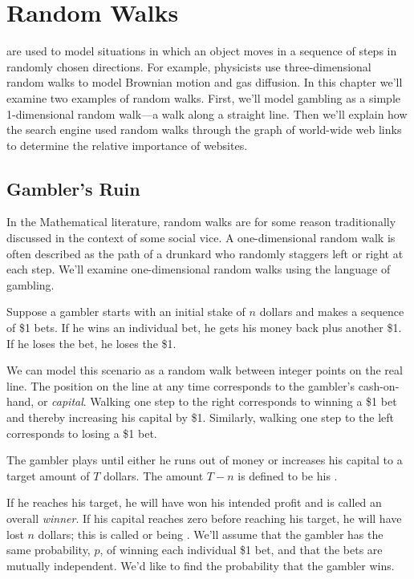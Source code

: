 \newcommand{\PRnk}{\operatorname{Rank}}

\chapter{Random Walks}\label{ran_process_chap}

 are used to model situations in which an object
moves in a sequence of steps in randomly chosen directions.  For
example, physicists use three-dimensional random walks to model
Brownian motion and gas diffusion.  In this chapter we'll examine two
examples of random walks.  First, we'll model gambling as a simple
1-dimensional random walk---a walk along a straight line.  Then we'll
explain how the  search engine used random walks through
the graph of world-wide web links to determine the relative importance
of websites.

\section{Gambler's Ruin}

\begin{editingnotes}
In the Mathematical literature, random walks are for some reason
traditionally discussed in the context of some social vice.  A
one-dimensional random walk is often described as the path of a drunkard
who randomly staggers left or right at each step.  We'll examine
one-dimensional random walks using the language of gambling.
\end{editingnotes}

Suppose a gambler starts with an initial stake of $n$ dollars and
makes a sequence of \$1 bets.  If he wins an individual bet, he gets
his money back plus another \$1.  If he loses the bet, he loses the
\$1.

We can model this scenario as a random walk between integer points on
the real line.  The position on the line at any time corresponds to
the gambler's cash-on-hand, or \emph{capital}.  Walking one step to the
right corresponds to winning a \$1 bet and thereby increasing his
capital by \$1.  Similarly, walking one step to the left corresponds
to losing a \$1 bet.

The gambler plays until either he runs out of money or increases
his capital to a target amount of $T$ dollars.  The amount $T-n$ is
defined to be his .

If he reaches his target, he will have won his intended profit and is
called an overall \emph{winner}.  If his capital reaches zero before
reaching his target, he will have lost $n$ dollars; this is called
 or being .  We'll assume that the
gambler has the same probability, $p$, of winning each individual \$1
bet, and that the bets are mutually independent.  We'd like to find
the probability that the gambler wins.


